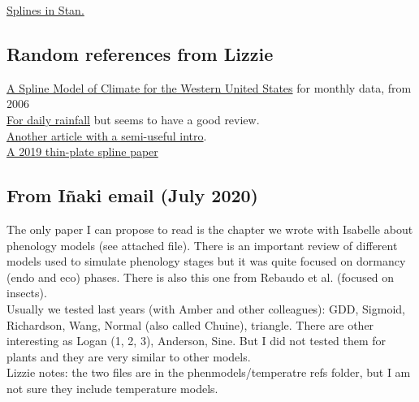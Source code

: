 \documentclass[11pt,letter]{article}
\begin{document}
\href{https://github.com/milkha/Splines_in_Stan/blob/master/splines_in_stan.pdf}{Splines in Stan.}\\

\subsection{Random references from Lizzie}

\href{https://www.fs.fed.us/rm/pubs/rmrs_gtr165.pdf}{A Spline Model of Climate for the
Western United States} for monthly data, from 2006\\

\href{https://rmets.onlinelibrary.wiley.com/doi/pdf/10.1002/joc.4068}{For daily rainfall} but seems to have a good review. \\

\href{https://agupubs.onlinelibrary.wiley.com/doi/full/10.1002/2013JD020803}{Another article with a semi-useful intro}.\\

\href{https://www.nature.com/articles/sdata2018299}{A 2019 thin-plate spline paper}

\subsection{From I\~naki email (July 2020)}

The only paper I can propose to read is the chapter we wrote with Isabelle about phenology models (see attached file). There is an important review of different models used to simulate phenology stages  but it was quite focused on dormancy (endo and eco) phases. 
There is also this one from Rebaudo et al. (focused on insects).\\

Usually we tested last years (with Amber and other colleagues): GDD, Sigmoid, Richardson, Wang, Normal (also called Chuine), triangle. 
There are other interesting as Logan (1, 2, 3), Anderson, Sine. But I did not tested them for plants and they are very similar to other models. \\

Lizzie notes: the two files are in the phenmodels/temperatre refs folder, but I am not sure they include temperature models.
\end{document}

